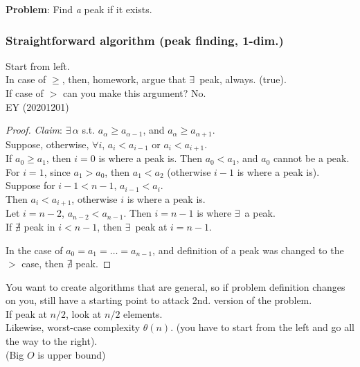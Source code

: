 \documentclass[10pt]{amsart}
\begin{document}
\begin{multicols*}{2}
\textbf{Problem}: Find \emph{a} peak if it exists. \\

\subsubsection{Straightforward algorithm (peak finding, 1-dim.)}

Start from left. \\

In case of $\geq$, then, homework, argue that $\exists \,$ peak, always. (true). \\
If case of $>$ can you make this argument? No. \\

EY (20201201)
\begin{proof}
	\emph{Claim}: $\exists \, \alpha$ s.t. $a_{\alpha} \geq a_{\alpha - 1}$, and $a_{\alpha} \geq a_{\alpha + 1}$. \\
	
	Suppose, otherwise, $\forall  i$, $a_i < a_{i-1}$ or $a_i < a_{i+1}$. \\
	If $a_0 \geq a_1$, then $i=0$ is where a peak is. Then $a_0 < a_1$, and $a_0$ cannot be a peak. \\
	For $i=1$, since $a_1 > a_0$, then $a_1 <a_2$ (otherwise $i-1$ is where a peak is). \\

	Suppose for $i - 1<n-1$, $a_{i-1} < a_i$. \\
	Then $a_i < a_{i+1}$, otherwise $i$ is where a peak is. \\
	Let $i= n-2$, $a_{n-2} < a_{n-1}$. Then $i = n-1$ is where $\exists \, $ a peak. \\
	If $\nexists$ peak in $i< n-1$, then $\exists \, $ peak at $i=n-1$. 
	
	In the case of $a_0 = a_1 = \dots = a_{n-1}$, and definition of a peak was changed to the $>$ case, then $\nexists $ peak.
\end{proof}

You want to create algorithms that are general, so if problem definition changes on you, still have a starting point to attack 2nd. version of the problem.\\

If peak at $n/2$, look at $n/2$ elements. \\
Likewise, worst-case complexity $\theta(n)$. (you have to start from the left and go all the way to the right). \\
(Big $O$ is upper bound) \\


\end{multicols*}
\end{document}
